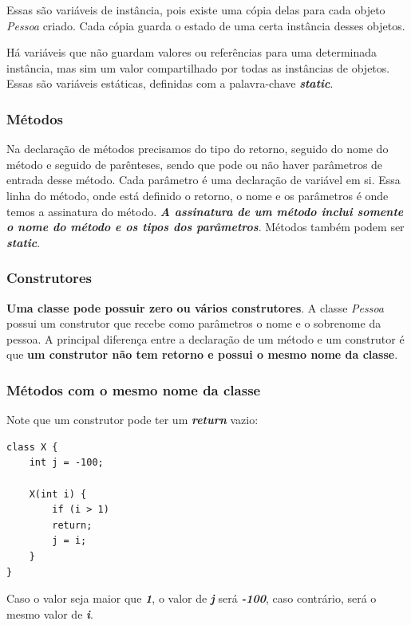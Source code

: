 \documentclass[12pt]{article}
\begin{document}
Essas são variáveis de instância, pois existe uma cópia delas para cada objeto \textit{Pessoa} criado. Cada cópia guarda o estado de uma certa instância desses objetos.

Há variáveis que não guardam valores ou referências para uma determinada instância, mas sim um valor compartilhado por todas as instâncias de objetos. Essas são variáveis estáticas, definidas com a palavra-chave \textbf{\textit{static}}.

\subsubsection{Métodos}

Na declaração de métodos precisamos do tipo do retorno, seguido do nome do método e seguido de parênteses, sendo que pode ou não haver parâmetros de entrada desse método. Cada parâmetro é uma declaração de variável em si. Essa linha do método, onde está definido o retorno, o nome e os parâmetros é onde temos a assinatura do método. \textbf{\textit{A assinatura de um método inclui somente o nome do método e os tipos dos parâmetros}}. Métodos também podem ser \textbf{\textit{static}}.

\subsubsection{Construtores}

\textbf{Uma classe pode possuir zero ou vários construtores}. A classe \textit{Pessoa} possui um construtor que recebe como parâmetros o nome e o sobrenome da pessoa. A principal diferença entre a declaração de um método e um construtor é que \textbf{um construtor não tem retorno e possui o mesmo nome da classe}.

\subsubsection{Métodos com o mesmo nome da classe}

Note que um construtor pode ter um \textbf{\textit{return}} vazio:

\begin{lstlisting}
class X {
	int j = -100;
	
	X(int i) {
		if (i > 1)
		return;
		j = i;
	}
}
\end{lstlisting}

Caso o valor seja maior que \textbf{\textit{1}}, o valor de \textbf{\textit{j}} será \textbf{\textit{-100}}, caso contrário, será o mesmo valor de \textbf{\textit{i}}.
\end{document}
